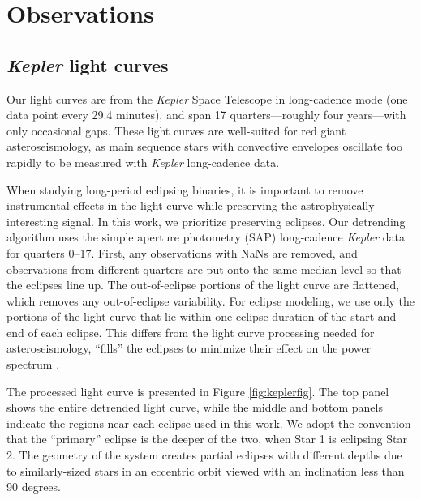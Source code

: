 \section{Observations}\label{data}

\subsection{\emph{Kepler} light curves}\label{kepler}
Our light curves are from the \emph{Kepler} Space Telescope in long-cadence mode (one data point every 29.4 minutes), and span 17 quarters---roughly four years---with only occasional gaps. These light curves are well-suited for red giant asteroseismology, as main sequence stars with convective envelopes oscillate too rapidly to be measured with \emph{Kepler} long-cadence data.

When studying long-period eclipsing binaries, it is important to remove instrumental effects in the light curve while preserving the astrophysically interesting signal. In this work, we prioritize preserving eclipses. Our detrending algorithm uses the simple aperture photometry (SAP) long-cadence \emph{Kepler} data for quarters 0--17. First, any observations with NaNs are removed, and observations from different quarters are put onto the same median level so that the eclipses line up. The out-of-eclipse portions of the light curve are flattened, which removes any out-of-eclipse variability. For eclipse modeling, we use only the portions of the light curve that lie within one eclipse duration of the start and end of each eclipse. This differs from the light curve processing needed for asteroseismology,  ``fills'' the eclipses to minimize their effect on the power spectrum \citep{gau14}.

The processed light curve is presented in Figure \ref{fig:keplerfig}. The top panel shows the entire detrended light curve, while the middle and bottom panels indicate the regions near each eclipse used in this work. We adopt the convention that the ``primary'' eclipse is the deeper of the two, when Star 1 is eclipsing Star 2. The geometry of the system creates partial eclipses with different depths due to similarly-sized stars in an eccentric orbit viewed with an inclination less than 90 degrees. 
  
  
  